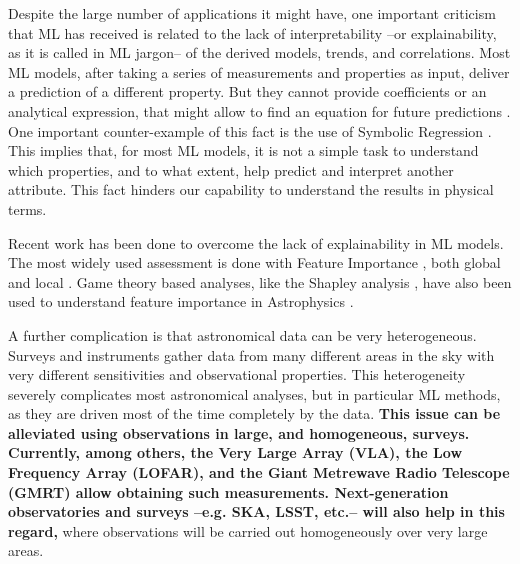 \documentclass{aa}
\begin{document}
Despite the large number of applications it might have, one important criticism that ML has received is related to the lack of interpretability --or explainability, as it is called in ML jargon-- of the derived models, trends, and correlations. Most ML models, after taking a series of measurements and properties as input, deliver a prediction of a different property. But they cannot provide coefficients or an analytical expression, that might allow to find an equation for future predictions \citep{goebel2018explainable}. One important counter-example of this fact is the use of Symbolic Regression \citep[e.g.][]{2020arXiv200611287C, 2021ApJ...915...71V}. This implies that, for most ML models, it is not a simple task to understand which properties, and to what extent, help predict and interpret another attribute. This fact hinders our capability to understand the results in physical terms.

Recent work has been done to overcome the lack of explainability in ML models. The most widely used assessment is done with Feature Importance \citep{10.1007/978-3-030-10925-7_40, 9007737}, both global and local \citep{Saarela2021}. Game theory based analyses, like the Shapley analysis \citep{Shapley_article}, have also been used to understand feature importance in Astrophysics \citep[e.g.][]{2021MNRAS.507.1468M, 2022MNRAS.515.5285D, 2021Galax...9...86C, 2022MNRAS.509.3441A, 2022MNRAS.516.4716A}. 

A further complication is that astronomical data can be very heterogeneous. 
Surveys and instruments gather data from many different areas in the sky with very different sensitivities and observational properties. This heterogeneity severely complicates most astronomical analyses, but in particular ML methods, as they are driven most of the time completely by the data. \textbf{This issue can be alleviated using observations in large, and homogeneous, surveys. Currently, among others, the Very Large Array (VLA), the Low Frequency Array (LOFAR), and the Giant Metrewave Radio Telescope (GMRT) allow obtaining such measurements. Next-generation observatories and surveys --e.g. SKA, LSST, etc.-- will also help in this regard,} where observations will be carried out homogeneously over very large areas.
\end{document}
